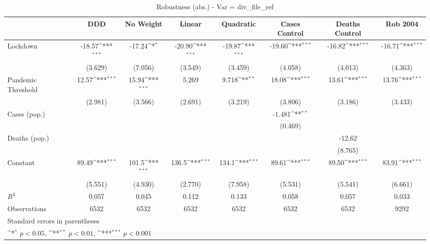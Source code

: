 \documentclass{article}
\begin{document}
{
\def\sym#1{\ifmmode^{#1}\else\(^{#1}\)\fi}
\begin{longtable}{l*{7}{c}}
\caption{Robustness (abs.) - Var = div\_file\_ref}\\
\hline\hline\endfirsthead\hline\endhead\hline\endfoot\endlastfoot
                &\multicolumn{1}{c}{DDD}&\multicolumn{1}{c}{No Weight}&\multicolumn{1}{c}{Linear}&\multicolumn{1}{c}{Quadratic}&\multicolumn{1}{c}{Cases Control}&\multicolumn{1}{c}{Deaths Control}&\multicolumn{1}{c}{Rob 2004}\\
\hline
Lockdown        &   -18.57\sym{***}&   -17.24\sym{*}  &   -20.90\sym{***}&   -19.87\sym{***}&   -19.60\sym{***}&   -16.82\sym{***}&   -16.71\sym{***}\\
                &  (3.629)         &  (7.056)         &  (3.549)         &  (3.459)         &  (4.058)         &  (4.013)         &  (4.363)         \\
Pandemic Threshold&    12.57\sym{***}&    15.94\sym{***}&    5.269         &    9.718\sym{**} &    18.08\sym{***}&    13.61\sym{***}&    13.76\sym{***}\\
                &  (2.981)         &  (3.566)         &  (2.691)         &  (3.219)         &  (3.806)         &  (3.186)         &  (3.433)         \\
Cases (pop.)    &                  &                  &                  &                  &   -1.481\sym{**} &                  &                  \\
                &                  &                  &                  &                  &  (0.469)         &                  &                  \\
Deaths (pop.)   &                  &                  &                  &                  &                  &   -12.62         &                  \\
                &                  &                  &                  &                  &                  &  (8.765)         &                  \\
Constant        &    89.49\sym{***}&    101.5\sym{***}&    136.5\sym{***}&    134.1\sym{***}&    89.61\sym{***}&    89.50\sym{***}&    83.91\sym{***}\\
                &  (5.551)         &  (4.930)         &  (2.770)         &  (7.958)         &  (5.531)         &  (5.541)         &  (6.661)         \\
\hline
\(R^{2}\)       &    0.057         &    0.045         &    0.112         &    0.133         &    0.058         &    0.057         &    0.033         \\
Observations    &     6532         &     6532         &     6532         &     6532         &     6532         &     6532         &     9292         \\
\hline\hline
\multicolumn{8}{l}{\footnotesize Standard errors in parentheses}\\
\multicolumn{8}{l}{\footnotesize \sym{*} \(p<0.05\), \sym{**} \(p<0.01\), \sym{***} \(p<0.001\)}\\
\end{longtable}
}
\end{document}
